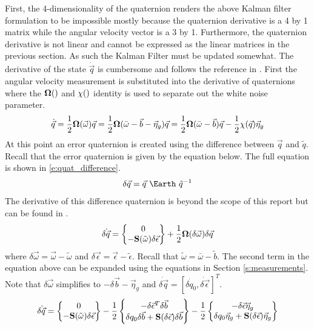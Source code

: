 First, the 4-dimensionality of the quaternion renders the
above Kalman filter formulation to be impossible mostly because the
quaternion derivative is a 4 by 1 matrix while the angular velocity
vector is a 3 by 1. Furthermore, the quaternion derivative is not
linear and cannot be expressed as the linear matrices in the previous
section. As such the Kalman Filter must be updated somewhat. The
derivative of the state $\dot{\vec{q}}$ is cumbersome and follows the
reference in \cite{Liu_Estimation}. First the angular 
velocity measurement is substituted into the derivative of
quaternions where the ${\bf \Omega}()$ and ${\bf \chi}()$ identity is used to
separate out the white noise parameter.
\begin{equation}
  \dot{\vec{q}} = \frac{1}{2}{\bf \Omega}(\vec{\omega})\vec{q} =
  \frac{1}{2}{\bf \Omega}(\bar{\omega}-\vec{b}-\vec{\eta}_g)\vec{q} =
  \frac{1}{2}{\bf \Omega}(\bar{\omega}-\vec{b})\vec{q} - \frac{1}{2}{\bf \chi}(\vec{q})\vec{\eta}_g
\end{equation}
At this point an error quaternion is created using the difference
between $\vec{q}$ and $\tilde{q}$. Recall that the error quaternion is
given by the equation below. The full equation is shown in
\ref{e:quat_difference}. 
\begin{equation}
  \delta \vec{q} = \vec{q}~\Earth~\tilde{q}^{-1}
\end{equation}
The derivative of this difference quaternion is beyond the scope of
this report but can be found in \cite{kalman_quat}.
\begin{equation}
  \dot{\delta \vec{q}} = \begin{Bmatrix} 0 \\ -{\bf
      S}(\tilde{\omega})\delta \vec{\epsilon} \end{Bmatrix} +
  \frac{1}{2}{\bf \Omega}(\delta \vec{\omega})\delta \vec{q}
\end{equation}
where $\delta \vec{\omega} = \vec{\omega} - \tilde{\omega}$ and
$\delta \vec{\epsilon} = \vec{\epsilon} - \tilde{\epsilon}$. Recall
that $\tilde{\omega} = \bar{\omega}-\tilde{b}$. The second term in the
equation above can be expanded using the equations in Section
\ref{s:measurements}. Note that $\delta \vec{\omega}$ simplifies to
$-\delta \vec{b} - \vec{\eta}_g$ and $\dot{\delta \vec{q}} = [\dot{\delta q_0},\dot{\delta
    \vec{\epsilon}}]^T$. 
\begin{equation}
  \dot{\delta \vec{q}} = \begin{Bmatrix} 0 \\ -{\bf
      S}(\tilde{\omega})\delta \vec{\epsilon} \end{Bmatrix} -
  \frac{1}{2}\begin{Bmatrix} -\delta \vec{\epsilon}^T\delta \vec{b}
    \\ \delta q_0 \delta \vec{b} + {\bf S}(\delta
    \vec{\epsilon})\delta \vec{b} \end{Bmatrix} -
  \frac{1}{2}\begin{Bmatrix} -\delta \vec{\epsilon} \vec{\eta}_g
    \\ \delta q_0 \vec{\eta}_g + {\bf S}(\delta
    \vec{\epsilon})\vec{\eta}_g \end{Bmatrix}
\end{equation}
